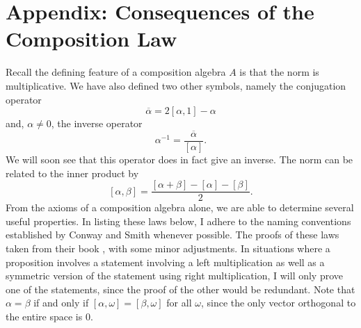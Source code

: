 \documentclass[10pt]{amsart}
\renewcommand{\bar}{\overline}
\newcommand{\norm}[1]{\left[#1\right]}
\begin{document}
\section{Appendix: Consequences of the Composition Law}
Recall the defining feature of a composition algebra $A$ is that the norm is multiplicative.  We have also defined two other symbols, namely the conjugation operator
$$
\bar{\alpha} = 2 \norm{\alpha, 1} - \alpha
$$
and, $\alpha \neq 0$, the inverse operator
$$
\alpha^{-1} = \frac{\bar{\alpha}}{\norm{\alpha}}.
$$
We will soon see that this operator does in fact give an inverse.  The norm can be related to the inner product by
$$
\norm{\alpha,\beta} = \frac{\norm{\alpha + \beta} - \norm{\alpha} - \norm{\beta}}{2}.
$$
From the axioms of a composition algebra alone, we are able to determine several useful properties.  In listing these laws below, I adhere to the naming conventions established by Conway and Smith whenever possible.  The proofs of these laws taken from their book \cite{Co03}, with some minor adjustments.  In situations where a proposition involves a statement involving a left multiplication as well as a symmetric version of the statement using right multiplication, I will only prove one of the statements, since the proof of the other would be redundant.  Note that $\alpha = \beta$ if and only if $\norm{\alpha, \omega} = \norm{\beta, \omega}$ for all $\omega$, since the only vector orthogonal to the entire space is $0$.
\end{document}
